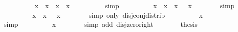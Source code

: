 \begin{isabellebody}
\ \ \isamarkupfalse%
\ {\isacharminus}{\kern0pt}\isanewline
\ \ \ \ \isamarkupfalse%
\ {\isachardoublequoteopen}x\ \isactrlbold {\isasymsqunion}\ x\ {\isacharequal}{\kern0pt}\ {\isacharparenleft}{\kern0pt}x\ \isactrlbold {\isasymsqunion}\ x{\isacharparenright}{\kern0pt}\ \isactrlbold {\isasymsqinter}\ \isanewline
\ \ \ \ \ \ \isamarkupfalse%
\ simp\isanewline
\ \ \ \ \isamarkupfalse%
\ \isamarkupfalse%
\ {\isachardoublequoteopen}{\isasymdots}\ {\isacharequal}{\kern0pt}\ {\isacharparenleft}{\kern0pt}x\ \isactrlbold {\isasymsqunion}\ x{\isacharparenright}{\kern0pt}\ \isactrlbold {\isasymsqinter}\ {\isacharparenleft}{\kern0pt}x\ \isactrlbold {\isasymsqunion}\ \isactrlbold {\isacharminus}{\kern0pt}\ x{\isacharparenright}{\kern0pt}{\isachardoublequoteclose}\isanewline
\ \ \ \ \ \ \isamarkupfalse%
\ simp\isanewline
\ \ \ \ \isamarkupfalse%
\ \isamarkupfalse%
\ {\isachardoublequoteopen}{\isasymdots}\ {\isacharequal}{\kern0pt}\ x\ \isactrlbold {\isasymsqunion}\ {\isacharparenleft}{\kern0pt}x\ \isactrlbold {\isasymsqinter}\ \isactrlbold {\isacharminus}{\kern0pt}\ x{\isacharparenright}{\kern0pt}{\isachardoublequoteclose}\isanewline
\ \ \ \ \ \ \isamarkupfalse%
\ {\isacharparenleft}{\kern0pt}simp\ only{\isacharcolon}{\kern0pt}\ disj{\isacharunderscore}{\kern0pt}conj{\isacharunderscore}{\kern0pt}distrib{\isacharparenright}{\kern0pt}\isanewline
\ \ \ \ \isamarkupfalse%
\ \isamarkupfalse%
\ {\isachardoublequoteopen}{\isasymdots}\ {\isacharequal}{\kern0pt}\ x\ \isactrlbold {\isasymsqunion}\ \isanewline
\ \ \ \ \ \ \isamarkupfalse%
\ simp\isanewline
\ \ \ \ \isamarkupfalse%
\ \isamarkupfalse%
\ {\isachardoublequoteopen}{\isasymdots}\ {\isacharequal}{\kern0pt}\ x{\isachardoublequoteclose}\isanewline
\ \ \ \ \ \ \isamarkupfalse%
\ {\isacharparenleft}{\kern0pt}simp\ add{\isacharcolon}{\kern0pt}\ disj{\isacharunderscore}{\kern0pt}zero{\isacharunderscore}{\kern0pt}right{\isacharparenright}{\kern0pt}\isanewline
\ \ \ \ \isamarkupfalse%
\ \isamarkupfalse%
\ {\isacharquery}{\kern0pt}thesis\ \isacommand{{\isachardot}{\kern0pt}}\isamarkupfalse%
\isanewline
\ \ \isamarkupfalse%
\isanewline
{}\isamarkupfalse%
%
\endisatagproof
{\isafoldproof}%
%
\isadelimproof
%
\endisadelimproof

\end{isabellebody}
